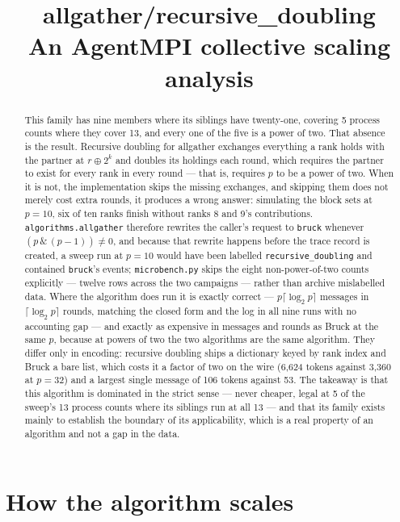 \documentclass[11pt]{article}
\title{\textbf{allgather/recursive\_doubling}\\[2pt]\large An AgentMPI collective scaling analysis}
\author{}
\date{}
\begin{document}
\maketitle

\begin{abstract}
This family has nine members where its siblings have twenty-one, covering 5 process counts where
they cover 13, and every one of the five is a power of two. That absence is the result. Recursive doubling for allgather exchanges everything a rank holds
with the partner at $r \oplus 2^k$ and doubles its holdings each round, which requires the
partner to exist for every rank in every round --- that is, requires $p$ to be a power of two.
When it is not, the implementation skips the missing exchanges, and skipping them does not merely
cost extra rounds, it produces a wrong answer: simulating the block sets at $p=10$, six of ten
ranks finish without ranks 8 and 9's contributions. \texttt{algorithms.allgather} therefore
rewrites the caller's request to \texttt{bruck} whenever $(p\,\&\,(p-1)) \ne 0$, and because that
rewrite happens before the trace record is created, a sweep run at $p=10$ would have been labelled
\texttt{recursive\_doubling} and contained \texttt{bruck}'s events; \texttt{microbench.py} skips
the eight non-power-of-two counts explicitly --- twelve rows across the two campaigns --- rather
than archive mislabelled data. Where the algorithm does run
it is exactly correct --- $p\lceil\log_2 p\rceil$ messages in $\lceil\log_2 p\rceil$ rounds,
matching the closed form and the log in all nine runs with no accounting gap --- and exactly as
expensive in messages and rounds as Bruck at the same $p$, because at powers of two the two
algorithms are the same algorithm. They differ only in encoding: recursive doubling ships a
dictionary keyed by rank index and Bruck a bare list, which costs it a factor of two on the wire
(6{,}624 tokens against 3{,}360 at $p=32$) and a largest single message of 106 tokens against 53.
The takeaway is that this algorithm is dominated in the strict sense --- never cheaper, legal at
5 of the sweep's 13 process counts where its siblings run at all 13 --- and that its family
exists mainly to establish the boundary of its
applicability, which is a real property of an algorithm and not a gap in the data.
\end{abstract}



\section{How the algorithm scales}
\end{document}
